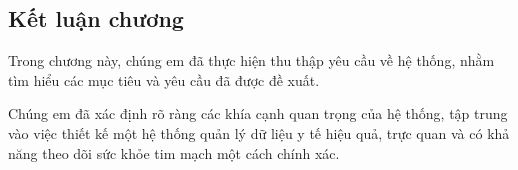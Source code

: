 \subsection{Kết luận chương}

Trong chương này, chúng em đã thực hiện thu thập yêu cầu về
 hệ thống, nhằm tìm hiểu   các mục tiêu và yêu cầu đã được đề xuất.

Chúng em đã xác định rõ ràng các khía cạnh quan trọng của hệ thống,
 tập trung vào việc thiết kế một hệ thống quản lý dữ liệu y tế hiệu quả,
  trực quan và có khả năng theo dõi sức khỏe tim mạch một cách
   chính xác. 


\newpage
